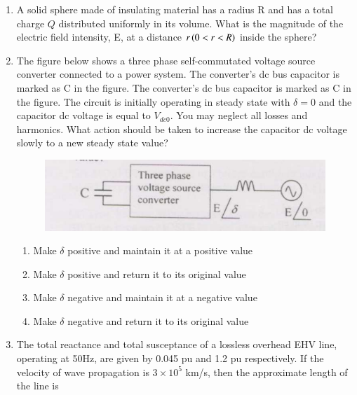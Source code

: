 \documentclass[journal,,12pt,onecolumn]{IEEEtran}
\theoremstyle{remark}
\begin{document}
\begin{enumerate}
\begin{enumerate}
\end{enumerate}
\bigskip
\item A solid sphere made of insulating material has a radius R and has a total charge $Q$ distributed uniformly in its volume. What is the magnitude of the electric field intensity, E, at a distance $r\left(0<r<R\right)$ inside the sphere?
\begin{enumerate}
\end{enumerate}
\bigskip
\item The figure below shows a three phase self-commutated voltage source converter connected to a power system. The converter's dc bus capacitor is marked as C in the figure. The converter's dc bus capacitor is marked as C in the figure. The circuit is initially operating in steady state with $\delta=0$ and the capacitor dc voltage is equal to $V_{dc0}$. You may neglect all losses and harmonics. What action should be taken to increase the capacitor dc voltage slowly to a new steady state value?
\begin{figure}[H]
   \centering
   \includegraphics[width=0.7\linewidth]{figs/fig_5.png}
   \label{stemplot}
\end{figure}
\begin{enumerate}
        \item Make $\delta$ positive and maintain it at a positive value
        \item Make $\delta$ positive and return it to its original value
        \item Make $\delta$ negative and maintain it at a negative value
        \item Make $\delta$ negative and return it to its original value
\end{enumerate}
\bigskip
\item The total reactance and total susceptance of a lossless overhead EHV line, operating at 50Hz, are given by 0.045 pu and 1.2 pu respectively. If the velocity of wave propagation is $3 \times 10^5$ km/s, then the approximate length of the line is

\end{enumerate}
\end{document}
